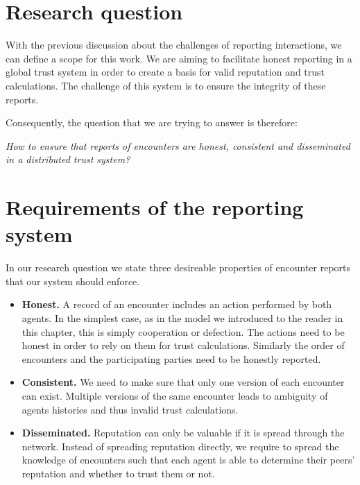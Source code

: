 
\section{Research question}
With the previous discussion about the challenges of reporting interactions, we can define a scope
for this work. We are aiming to facilitate honest reporting in a global trust system in order to 
create a basis for valid reputation and trust calculations. The challenge of this system is to 
ensure the integrity of these reports. 

Consequently, the question that we are trying to answer is therefore:
\begin{center}
    \textit{How to ensure that reports of encounters are honest, consistent and disseminated in a distributed trust system?}
\end{center}



\section{Requirements of the reporting system}
In our research question we state three desireable properties of encounter reports that our system 
should enforce.

\begin{itemize}
    \item \textbf{Honest.} A record of an encounter
    includes an action performed by both agents. In the simplest case, as in the model we introduced to
    the reader in this chapter, this is simply cooperation or defection. The actions need to be honest 
    in order to rely on them for trust calculations. Similarly the order of encounters and the participating
    parties need to be honestly reported.
    \item \textbf{Consistent.}  We need to make 
    sure that only one version of each encounter can exist. Multiple versions of the same encounter
    leads to ambiguity of agents histories and thus invalid trust calculations.
    \item \textbf{Disseminated.} Reputation can only be valuable
    if it is spread through the network. Instead of spreading reputation directly, we require to 
    spread the knowledge of encounters such that each agent is able to determine their peers' reputation
    and whether to trust them or not.
\end{itemize}

